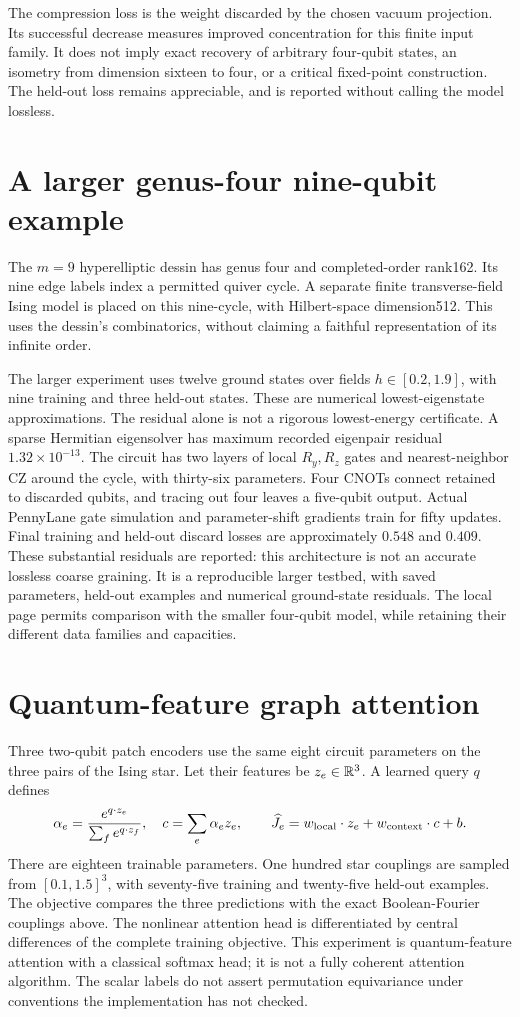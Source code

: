 The compression loss is the weight discarded by the chosen vacuum projection. Its successful decrease measures improved concentration for this finite input family. It does not imply exact recovery of arbitrary four-qubit states, an isometry from dimension sixteen to four, or a critical fixed-point construction. The held-out loss remains appreciable, and is reported without calling the model lossless.

\section{A larger genus-four nine-qubit example}
The $m=9$ hyperelliptic dessin has genus four and completed-order rank162. Its nine edge labels index a permitted quiver cycle. A separate finite transverse-field Ising model is placed on this nine-cycle, with Hilbert-space dimension512. This uses the dessin's combinatorics, without claiming a faithful representation of its infinite order.

The larger experiment uses twelve ground states over fields $h\in[0.2,1.9]$, with nine training and three held-out states. These are numerical lowest-eigenstate approximations. The residual alone is not a rigorous lowest-energy certificate. A sparse Hermitian eigensolver has maximum recorded eigenpair residual $1.32\times10^{-13}$. The circuit has two layers of local $R_y,R_z$ gates and nearest-neighbor CZ around the cycle, with thirty-six parameters. Four CNOTs connect retained to discarded qubits, and tracing out four leaves a five-qubit output. Actual PennyLane gate simulation and parameter-shift gradients train for fifty updates. Final training and held-out discard losses are approximately $0.548$ and $0.409$. These substantial residuals are reported: this architecture is not an accurate lossless coarse graining. It is a reproducible larger testbed, with saved parameters, held-out examples and numerical ground-state residuals. The local page permits comparison with the smaller four-qubit model, while retaining their different data families and capacities.

\section{Quantum-feature graph attention}
Three two-qubit patch encoders use the same eight circuit parameters on the three pairs of the Ising star. Let their features be $z_e\in\mathbb R^3$. A learned query $q$ defines
\[
 \alpha_e=\frac{e^{q\cdot z_e}}{\sum_f e^{q\cdot z_f}},\quad
 c=\sum_e\alpha_e z_e,\qquad
 \widehat J_e=w_{\rm local}\cdot z_e+w_{\rm context}\cdot c+b.
\]
There are eighteen trainable parameters. One hundred star couplings are sampled from $[0.1,1.5]^3$, with seventy-five training and twenty-five held-out examples. The objective compares the three predictions with the exact Boolean-Fourier couplings above. The nonlinear attention head is differentiated by central differences of the complete training objective. This experiment is quantum-feature attention with a classical softmax head; it is not a fully coherent attention algorithm. The scalar labels do not assert permutation equivariance under conventions the implementation has not checked.

